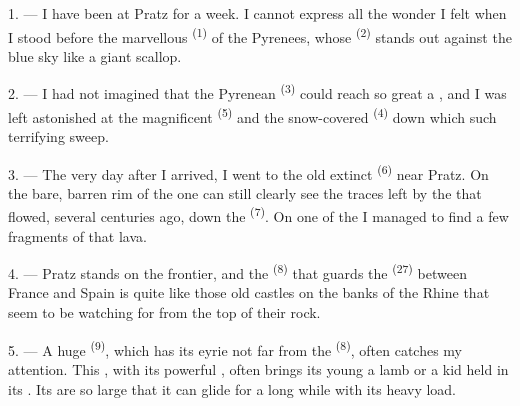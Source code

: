 
\VUsaut{4.0mm}
\VUsaut{3.0mm}

\VUsaut{3.0mm}

\VUsaut{3.0mm}

1. --- I have been at Pratz for a week. I cannot express all the wonder I
felt when I stood before the marvellous 
\textsuperscript{(1)} of the Pyrenees, whose  \textsuperscript{(2)} stands out
against the blue sky like a giant scallop.

2. --- I had not imagined that the Pyrenean  \textsuperscript{(3)}
could reach so great a , and I was left astonished at the
magnificent  \textsuperscript{(5)} and the snow-covered
 \textsuperscript{(4)} down which such terrifying 
sweep.

\VUsaut{3.0mm}
\VUsaut{3.0mm}

3. --- The very day after I arrived, I went to the old extinct
 \textsuperscript{(6)} near Pratz. On the bare, barren rim of the
 one can still clearly see the traces left by the
 that flowed, several centuries ago, down the
 \textsuperscript{(7)}. On one of the  I managed
to find a few fragments of that lava.

4. --- Pratz stands on the frontier, and the 
\textsuperscript{(8)} that guards the  \textsuperscript{(27)} between France
and Spain is quite like those old castles on the banks of the Rhine that
seem to be watching for  from the top of their rock.

5. --- A huge  \textsuperscript{(9)}, which has its eyrie not far from
the  \textsuperscript{(8)}, often catches my attention. This
, with its powerful , often brings its
young a lamb or a kid held in its . Its  are so
large that it can glide for a long while with its heavy load.

